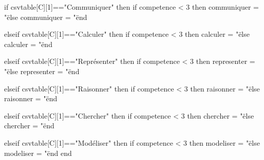 \documentclass[fiche]{classe-tex3R}
\begin{document}
\begin{luacode*}
{                        if csvtable[C][1]=="Communiquer" then
                            if competence < 3 then
                                communiquer = "\"
                            else
                                communiquer = "\"
                            end
    
                        elseif csvtable[C][1]=="Calculer" then
                            if competence < 3 then
                                calculer = "\"
                            else
                                calculer = "\"
                            end
    
                        elseif csvtable[C][1]=="Représenter" then
                            if competence < 3 then
                                representer = "\"
                            else
                                representer = "\"
                            end
                       
                        elseif csvtable[C][1]=="Raisonner" then
                            if competence < 3 then
                                raisonner = "\"
                            else
                                raisonner = "\"
                            end
    
                        elseif csvtable[C][1]=="Chercher" then
                            if competence < 3 then
                                chercher = "\"
                            else
                                chercher = "\"
                            end
    
                        elseif csvtable[C][1]=="Modéliser" then
                            if competence < 3 then
                                modeliser = "\"
                            else
                                modeliser = "\"
                            end
                        end
                    
}
\end{luacode*}
\end{document}
